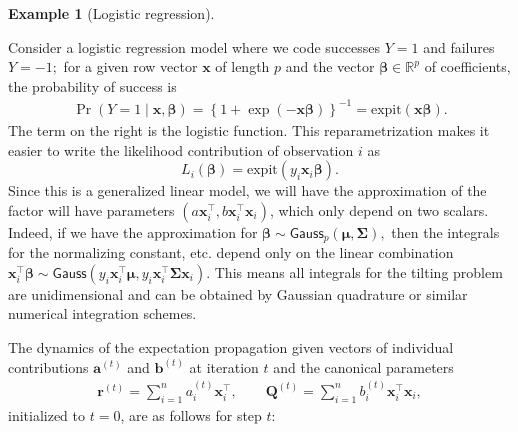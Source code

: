 \documentclass[
  11pt,
  letterpaper,
]{scrbook}
\theoremstyle{definition}
\newtheorem{example}{Example}[chapter]
\theoremstyle{plain}
\theoremstyle{plain}
\theoremstyle{plain}
\theoremstyle{definition}
\theoremstyle{definition}
\theoremstyle{plain}
\theoremstyle{plain}
\theoremstyle{remark}
\begin{document}
\begin{example}[Logistic
regression]\protect\hypertarget{exm-logistic-ep}{}\label{exm-logistic-ep}

Consider a logistic regression model where we code successes \(Y=1\) and
failures \(Y=-1;\) for a given row vector \(\mathbf{x}\) of length \(p\)
and the vector \(\boldsymbol{\beta} \in \mathbb{R}^p\) of coefficients,
the probability of success is \begin{align*}
\Pr(Y=1 \mid \mathbf{x}, \boldsymbol{\beta}) = \left\{1+\exp(-\mathbf{x}\boldsymbol{\beta})\right\}^{-1} = \mathrm{expit}(\mathbf{x}\boldsymbol{\beta}).
\end{align*} The term on the right is the logistic function. This
reparametrization makes it easier to write the likelihood contribution
of observation \(i\) as
\[L_i(\boldsymbol{\beta}) = \mathrm{expit}(y_i \mathbf{x}_i\boldsymbol{\beta}).\]
Since this is a generalized linear model, we will have the approximation
of the factor will have parameters
\((a\mathbf{x}_i^\top, b\mathbf{x}_i^\top\mathbf{x}_i)\), which only
depend on two scalars. Indeed, if we have the approximation for
\(\boldsymbol{\beta} \sim \mathsf{Gauss}_p(\boldsymbol{\mu}, \boldsymbol{\Sigma}),\)
then the integrals for the normalizing constant, etc. depend only on the
linear combination
\(\mathbf{x}_i^\top\boldsymbol{\beta} \sim \mathsf{Gauss}(y_i \mathbf{x}_i^\top\boldsymbol{\mu}, y_i \mathbf{x}_i^\top\boldsymbol{\Sigma}\mathbf{x}_i).\)
This means all integrals for the tilting problem are unidimensional and
can be obtained by Gaussian quadrature or similar numerical integration
schemes.

\end{example}

The dynamics of the expectation propagation given vectors of individual
contributions \(\boldsymbol{a}^{(t)}\) and \(\boldsymbol{b}^{(t)}\) at
iteration \(t\) and the canonical parameters \begin{align*}
\boldsymbol{r}^{(t)} = \sum_{i=1}^n a_i^{(t)}\mathbf{x}_i^\top, \qquad \mathbf{Q}^{(t)} = \sum_{i=1}^n b_i^{(t)}\mathbf{x}_i^\top\mathbf{x}_i,
\end{align*} initialized to \(t=0\), are as follows for step \(t\):
\end{document}
